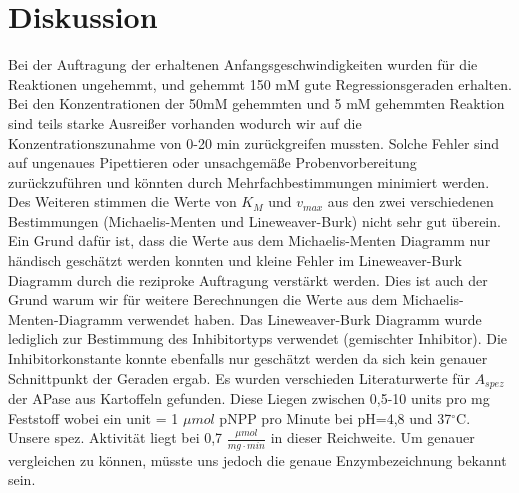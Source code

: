 \section{Diskussion}

Bei der Auftragung der erhaltenen Anfangsgeschwindigkeiten wurden für die Reaktionen ungehemmt, und gehemmt 150 mM gute Regressionsgeraden erhalten. Bei den Konzentrationen der 50mM gehemmten und 5 mM gehemmten Reaktion sind teils starke Ausreißer vorhanden wodurch wir auf die Konzentrationszunahme von 0-20 min zurückgreifen mussten. Solche Fehler sind auf ungenaues Pipettieren oder unsachgemäße Probenvorbereitung zurückzuführen und könnten durch Mehrfachbestimmungen minimiert werden. 
Des Weiteren stimmen die Werte von $K_M$ und $v_{max}$ aus den zwei verschiedenen Bestimmungen (Michaelis-Menten und Lineweaver-Burk) nicht sehr gut überein. Ein Grund dafür ist, dass die Werte aus dem Michaelis-Menten Diagramm nur händisch geschätzt werden konnten und kleine Fehler im Lineweaver-Burk Diagramm durch die reziproke Auftragung verstärkt werden. Dies ist auch der Grund warum wir für weitere Berechnungen die Werte aus dem Michaelis-Menten-Diagramm verwendet haben. Das Lineweaver-Burk Diagramm wurde lediglich zur Bestimmung des Inhibitortyps verwendet (gemischter Inhibitor).
Die Inhibitorkonstante konnte ebenfalls nur geschätzt werden da sich kein genauer Schnittpunkt der Geraden ergab.
Es wurden verschieden Literaturwerte für $A_{spez}$ der APase aus Kartoffeln gefunden. Diese Liegen zwischen 0,5-10 units pro mg Feststoff wobei ein unit = 1 $\mu mol$ pNPP pro Minute bei pH=4,8 und 37$^\circ$C. Unsere spez. Aktivität liegt bei 0,7 $\frac{\mu mol}{mg \cdot min}$ \cite{Aspez}  in dieser Reichweite. Um genauer vergleichen zu können, müsste uns jedoch die genaue Enzymbezeichnung bekannt sein. 
